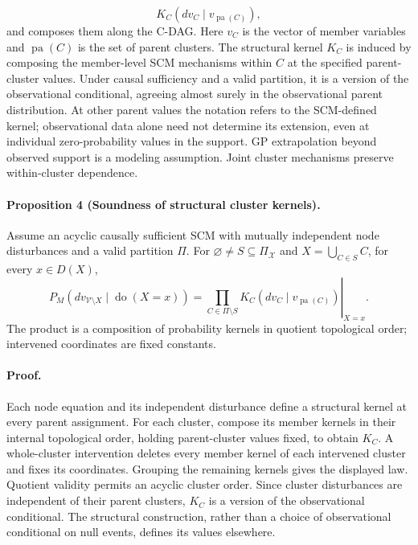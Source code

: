 \[
 K_C(dv_C\mid v_{\operatorname{pa}(C)}),
\]
and composes them along the C-DAG. Here $v_C$ is the vector of member
variables and $\operatorname{pa}(C)$ is the set of parent clusters.
The structural kernel $K_C$ is induced by composing the member-level SCM
mechanisms within $C$ at the specified parent-cluster values. Under causal
sufficiency and a valid partition, it is a version of the observational
conditional, agreeing almost surely in the observational parent distribution.
At other parent values the notation refers to the SCM-defined kernel;
observational data alone need not determine its extension, even at
individual zero-probability values in the support. GP extrapolation beyond
observed support is a modeling assumption. Joint cluster mechanisms preserve
within-cluster dependence.

\paragraph{Proposition 4 (Soundness of structural cluster kernels).}
Assume an acyclic causally sufficient SCM with mutually independent
node disturbances and a valid partition $\Pi$. For
$\varnothing\ne S\subseteq\Pi_{\mathcal X}$ and $X=\bigcup_{C\in S}C$,
for every $x\in D(X)$,
\[
 P_M(dv_{\mathcal V\setminus X}\mid\operatorname{do}(X=x))
 =\left.\prod_{C\in\Pi\setminus S}
 K_C(dv_C\mid v_{\operatorname{pa}(C)})\right|_{X=x}.
\]
The product is a composition of probability kernels in quotient
topological order; intervened coordinates are fixed constants.

\paragraph{Proof.}
Each node equation and its independent disturbance define a structural
kernel at every parent assignment. For each cluster, compose its member
kernels in their internal topological order, holding parent-cluster values
fixed, to obtain $K_C$. A whole-cluster intervention deletes every member
kernel of each intervened cluster and fixes its coordinates. Grouping the
remaining kernels gives the displayed law. Quotient validity permits an
acyclic cluster order. Since cluster disturbances are independent of their
parent clusters, $K_C$ is a version of the observational conditional.
The structural construction, rather than a choice of observational
conditional on null events, defines its values elsewhere.

